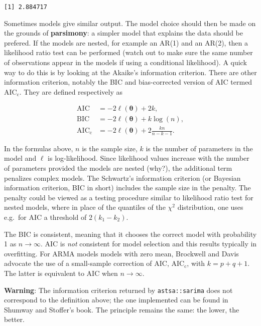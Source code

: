 \documentclass[]{book}
\begin{document}
\begin{verbatim}
[1] 2.884717
\end{verbatim}

Sometimes models give similar output. The model choice should then be
made on the grounds of \textbf{parsimony}: a simpler model that explains
the data should be prefered. If the models are nested, for example an
AR(1) and an AR(2), then a likelihood ratio test can be performed (watch
out to make sure the same number of observations appear in the models if
using a conditional likelihood). A quick way to do this is by looking at
the Akaike's information criterion. There are other information
criterion, notably the BIC and bias-corrected version of AIC termed
\(\mathrm{AIC}_{\mathrm{c}}\). They are defined respectively as

\[
\begin{align*}
\mathrm{AIC}& = -2\ell(\boldsymbol{\theta})+2k,\\
\mathrm{BIC}& = -2\ell(\boldsymbol{\theta})+k\log(n),\\
\mathrm{AIC}_{\mathrm{c}}& = -2\ell(\boldsymbol{\theta})+2 \frac{kn}{n-k-1}.
\end{align*}
\]

In the formulas above, \(n\) is the sample size, \(k\) is the number of
parameters in the model and \(\ell\) is log-likelihood. Since likelihood
values increase with the number of parameters provided the models are
nested (why?), the additional term penalizes complex models. The
Schwartz's information criterion (or Bayesian information criterion, BIC
in short) includes the sample size in the penalty. The penalty could be
viewed as a testing procedure similar to likelihood ratio test for
nested models, where in place of the quantiles of the \(\chi^2\)
distribution, one uses e.g.~for AIC a threshold of \(2(k_1-k_2)\).

The BIC is consistent, meaning that it chooses the correct model with
probability 1 as \(n \to \infty\). AIC is \emph{not} consistent for
model selection and this results typically in overfitting. For ARMA
models models with zero mean, Brockwell and Davis advocate the use of a
small-sample correction of AIC, AIC\(_\mathrm{c}\), with \(k = p+q+1\).
The latter is equivalent to AIC when \(n \to \infty\).

\textbf{Warning}: The information criterion returned by
\texttt{astsa::sarima} does not correspond to the definition above; the
one implemented can be found in Shumway and Stoffer's book. The
principle remains the same: the lower, the better.
\end{document}
